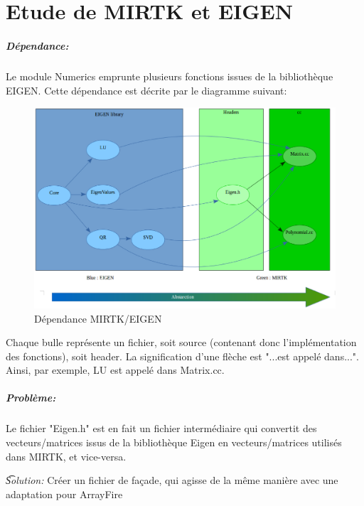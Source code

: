 \documentclass{report}
\begin{document}
\chapter*{Etude de MIRTK et EIGEN}

\paragraph{Dépendance:} 

Le module Numerics emprunte plusieurs fonctions issues de la bibliothèque EIGEN. Cette dépendance est décrite par le diagramme suivant: 

\begin{figure}[h!]
	\begin{center}
		\includegraphics[width=16cm]{figures/eigen_mirtk.eps}
	\end{center}	
	\caption{Dépendance MIRTK/EIGEN}
	\label{Dépendance MIRTK/EIGEN}
\end{figure}

Chaque bulle représente un fichier, soit source (contenant donc l'implémentation des fonctions), soit header. La signification d'une flèche est "...est appelé dans...". Ainsi, par exemple, LU est appelé dans Matrix.cc. 

\paragraph{Problème:}
 Le fichier "Eigen.h" est en fait un fichier intermédiaire qui convertit des vecteurs/matrices issus de la bibliothèque Eigen en vecteurs/matrices utilisés dans MIRTK, et vice-versa.
 
\textit{\t Solution: } Créer un fichier de façade, qui agisse de la même manière avec une adaptation pour ArrayFire
\end{document}
